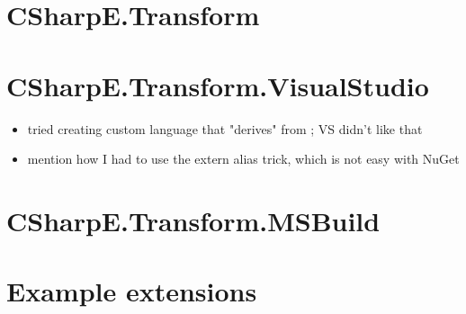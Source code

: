 \section{CSharpE.Transform}

\section{CSharpE.Transform.VisualStudio}

\begin{itemize}
\item tried creating custom language that "derives" from ; VS didn't like that
\item mention how I had to use the extern alias trick, which is not easy with NuGet
\end{itemize}

\section{CSharpE.Transform.MSBuild}

\section{Example extensions}